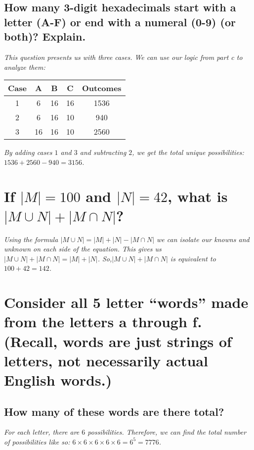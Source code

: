 \documentclass{article}
\begin{document}
\subsection{How many 3-digit hexadecimals start with a letter (A-F) or end with a numeral (0-9) (or both)? Explain.}
\hspace{1cm}\textit{This question presents us with three cases. We can use our logic from part c to
    analyze them:}
\begin{center}
    \begin{tabular}{c|c|c|c|c}
        Case & A & B & C & Outcomes \\
        \hline
        1 & 6 & 16 & 16 & 1536 \\
        \hline
        2 & 6 & 16 & 10 & 940 \\
        \hline
        3 & 16 & 16 & 10 & 2560 \\
        \hline
    \end{tabular}
\end{center}
\hspace{1cm}\textit{By adding cases $1$ and $3$ and subtracting $2$, we get the total unique
    possibilities: $1536+2560-940 = 3156$.}

\section{If $|M| = 100$ and $|N| = 42$, what is $|M\cup N|+|M\cap N|$?}
\hspace{1cm}\textit{Using the formula $|M\cup N|=|M|+|N|-|M\cap N|$ we can isolate our knowns and unknown
    on each side of the equation. This gives us $|M\cup N|+|M\cap N| = |M|+|N|$. So,$|M\cup N|+|M\cap N|$
    is equivalent to $100+42 = 142$.}

\section{Consider all 5 letter “words” made from the letters a through f.
    (Recall, words are just strings of letters, not necessarily actual English words.)}
\subsection{How many of these words are there total?}
\hspace{1cm}\textit{For each letter, there are $6$ possibilities. Therefore, we can find the total number
    of possibilities like so: $6\times 6\times 6\times 6\times 6 = 6^5 = 7776$.}
\end{document}
